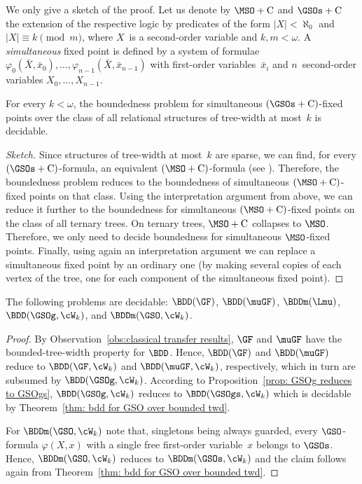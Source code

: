 \documentclass{LMCS}
\begin{document}
We only give a sketch of the proof.
Let us denote by $\MSO+\mathrm{C}$ and $\GSOs+\mathrm{C}$ the extension
of the respective logic by predicates of the form
$\lvert X\rvert < \aleph_0$ and $\lvert X\rvert \equiv k \pmod m$,
where $X$~is a second-order variable and $k,m < \omega$.
A \emph{simultaneous} fixed point is defined by a system of formulae
$\varphi_0(\bar X,\bar x_0),\dots,\varphi_{n-1}(\bar X,\bar x_{n-1})$
with first-order variables~$\bar x_i$ and $n$~second-order variables $X_0,\dots,X_{n-1}$.
\begin{thm}\label{thm: bdd for GSO over bounded twd}
For every $k < \omega$, the boundedness problem for simultaneous $(\GSOs + \mathrm{C})$-fixed points
over the class of all relational structures of tree-width at most~$k$
is decidable.
\end{thm}
\begin{proof}[Sketch]
Since structures of tree-width at most~$k$ are sparse,
we can find, for every $(\GSOs+\mathrm{C})$-formula, an equivalent $(\MSO+\mathrm{C})$-formula
(see \cite{Courcelle03,Blumensath10}).
Therefore, the boundedness problem reduces to the boundedness
of simultaneous $(\MSO+\mathrm{C})$-fixed points on that class.
Using the interpretation argument from above, we can reduce it further
to the boundedness for simultaneous $(\MSO+\mathrm{C})$-fixed points
on the class of all ternary trees. On ternary trees,
$\MSO+\mathrm{C}$ collapses to $\MSO$.
Therefore, we only need to decide boundedness for simultaneous
$\MSO$-fixed points.
Finally, using again an interpretation argument we can replace
a simultaneous fixed point by an ordinary one (by making several copies of each vertex
of the tree, one for each component of the simultaneous fixed point).
\end{proof}
\begin{cor}\label{cor:decidability of BDD(GF), etc}
The following problems are decidable\?:
$\BDD(\GF)$, $\BDD(\muGF)$, $\BDDm(\Lmu)$, $\BDD(\GSOg,\cW_k)$, and\/
$\BDDm(\GSO,\cW_k)$.
\end{cor}
\begin{proof}
By Observation~\ref{obs:classical transfer results},
$\GF$ and $\muGF$ have the bounded-tree-width property for $\BDD$.
Hence, $\BDD(\GF)$ and $\BDD(\muGF)$ reduce to $\BDD(\GF,\cW_k)$ and $\BDD(\muGF,\cW_k)$, respectively,
which in turn are subsumed by $\BDD(\GSOg,\cW_k)$.
According to Proposition~\ref{prop: GSOg reduces to GSOgs},
$\BDD(\GSOg,\cW_k)$ reduces to $\BDD(\GSOgs,\cW_k)$ which is decidable
by Theorem~\ref{thm: bdd for GSO over bounded twd}.

For $\BDDm(\GSO,\cW_k)$ note that, singletons being always guarded,
every $\GSO$-formula $\varphi(X,x)$
with a single free first-order variable~$x$ belongs
to $\GSOs$.
Hence, $\BDDm(\GSO,\cW_k)$ reduces to $\BDDm(\GSOs,\cW_k)$
and the claim follows again from Theorem~\ref{thm: bdd for GSO over bounded twd}.
\end{proof}
\end{document}

